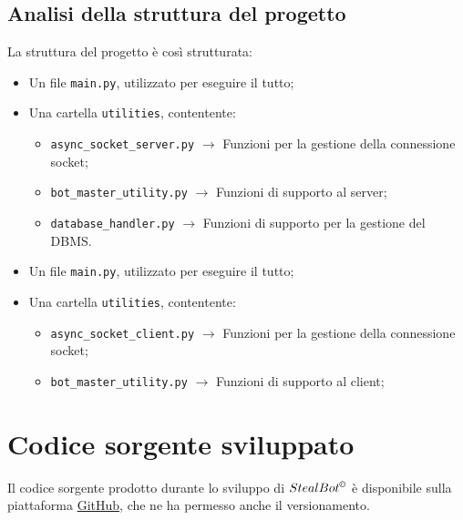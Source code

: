 \documentclass[letterpaper, 11pt]{article}
\begin{document}
\subsection{Analisi della struttura del progetto}
\label{Analisi progetto}
La struttura del progetto è così strutturata:

\noindent
\begin{minipage}[t]{0.47\textwidth}
  \begin{itemize}
    \item Un file \texttt{main.py}, utilizzato per eseguire il tutto;
    \item Una cartella \texttt{utilities}, contentente:
    \begin{itemize}
      \item \texttt{async\_socket\_server.py} $\rightarrow$ Funzioni per la gestione della connessione socket;
      \item \texttt{bot\_master\_utility.py} $\rightarrow$ Funzioni di supporto al server;
      \item \texttt{database\_handler.py} $\rightarrow$ Funzioni di supporto per la gestione del DBMS.
    \end{itemize}
  \end{itemize}
\end{minipage}
\hfill
\noindent
\begin{minipage}[t]{0.47\textwidth}
  \begin{itemize}
    \item Un file \texttt{main.py}, utilizzato per eseguire il tutto;
    \item Una cartella \texttt{utilities}, contentente:
    \begin{itemize}
      \item \texttt{async\_socket\_client.py} $\rightarrow$ Funzioni per la gestione della connessione socket;
      \item \texttt{bot\_master\_utility.py} $\rightarrow$ Funzioni di supporto al client;
    \end{itemize}
  \end{itemize}
\end{minipage}
\section{Codice sorgente sviluppato}
\label{Codice sorgente}
Il codice sorgente prodotto durante lo sviluppo di \(StealBot^{\copyright}\) è disponibile sulla piattaforma \href{https://github.com/}{GitHub}, che ne ha permesso anche il versionamento.
\end{document}
